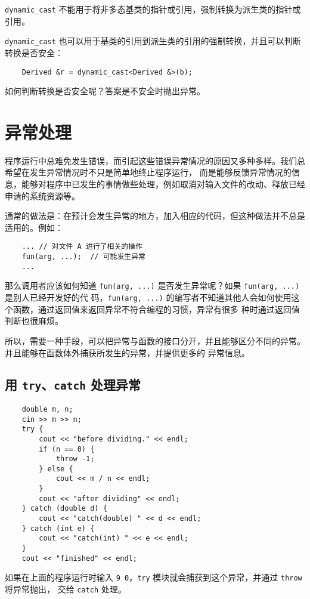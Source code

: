 \documentclass[UTF8]{ctexart}
\begin{document}
\texttt{dynamic\_cast} 不能用于将非多态基类的指针或引用，强制转换为派生类的指针或引用。

\texttt{dynamic\_cast} 也可以用于基类的引用到派生类的引用的强制转换，并且可以判断转换是否安全：
\begin{verbatim}
    Derived &r = dynamic_cast<Derived &>(b);
\end{verbatim}

如何判断转换是否安全呢？答案是不安全时抛出异常。

\section{异常处理}
程序运行中总难免发生错误，而引起这些错误异常情况的原因又多种多样。我们总希望在发生异常情况时不只是简单地终止程序运行，
而是能够反馈异常情况的信息，能够对程序中已发生的事情做些处理，例如取消对输入文件的改动、释放已经申请的系统资源等。

通常的做法是：在预计会发生异常的地方，加入相应的代码，但这种做法并不总是适用的。例如：
\begin{verbatim}
    ... // 对文件 A 进行了相关的操作
    fun(arg, ...);  // 可能发生异常
    ...
\end{verbatim}

那么调用者应该如何知道 \texttt{fun(arg, ...)} 是否发生异常呢？如果 \texttt{fun(arg, ...)} 是别人已经开发好的代
码，\texttt{fun(arg, ...)} 的编写者不知道其他人会如何使用这个函数，通过返回值来返回异常不符合编程的习惯，异常有很多
种时通过返回值判断也很麻烦。

所以，需要一种手段，可以把异常与函数的接口分开，并且能够区分不同的异常。并且能够在函数体外捕获所发生的异常，并提供更多的
异常信息。

\subsection{用 \texttt{try}、\texttt{catch} 处理异常}
\begin{verbatim}
    double m, n;
    cin >> m >> n;
    try {
        cout << "before dividing." << endl;
        if (n == 0) {
            throw -1;
        } else {
            cout << m / n << endl;
        }
        cout << "after dividing" << endl;
    } catch (double d) {
        cout << "catch(double) " << d << endl;
    } catch (int e) {
        cout << "catch(int) " << e << endl;
    }
    cout << "finished" << endl;
\end{verbatim}

如果在上面的程序运行时输入 \texttt{9 0}，\texttt{try} 模块就会捕获到这个异常，并通过 \texttt{throw} 将异常抛出，
交给 \texttt{catch} 处理。
\end{document}
